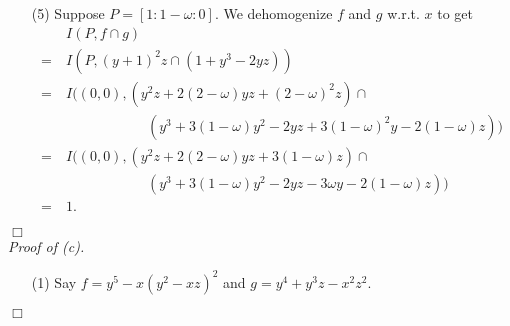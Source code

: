 \documentclass{article}
\begin{document}
\begin{enumerate}
\item[(5)]
  Suppose $P = [1:1-\omega:0]$.
  We dehomogenize $f$ and $g$ w.r.t. $x$ to get
  \begin{align*}
    & \: I(P, f \cap g) \\
    =& \: I(P, (y+1)^2z \cap (1+y^3 - 2yz)) \\
    =& \: I((0,0), (y^2z + 2(2-\omega)yz + (2-\omega)^2z) \cap \\
      & \qquad\qquad\qquad
      (y^3 + 3(1-\omega)y^2 - 2yz + 3(1-\omega)^2 y - 2(1-\omega)z)) \\
    =& \: I((0,0), (y^2z + 2(2-\omega)yz + 3(1-\omega)z) \cap \\
      & \qquad\qquad\qquad
      (y^3 + 3(1-\omega)y^2 - 2yz - 3\omega y - 2(1-\omega)z)) \\
    =& \: 1.
  \end{align*}
\end{enumerate}
$\Box$ \\



\emph{Proof of (c).}
\begin{enumerate}
\item[(1)]
  Say $f = y^5 - x(y^2-xz)^2$ and $g = y^4 + y^3z - x^2z^2$.


\end{enumerate}
$\Box$ \\
\end{document}
